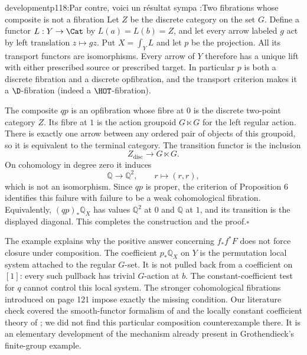 \begin{dcomment}{development}{p118:Par contre, voici un résultat sympa :}{Two fibrations whose composite is not a fibration}
Let $Z$ be the discrete category on the set $G$. Define a functor $L:Y\to\Cat$ by $L(a)=L(b)=Z$, and let every arrow labeled $g$ act by left translation $z\mapsto gz$. Put $X=\int_Y L$ and let $p$ be the projection. All its transport functors are isomorphisms. Every arrow of $Y$ therefore has a unique lift with either prescribed source or prescribed target. In particular $p$ is both a discrete fibration and a discrete opfibration, and the transport criterion makes it a $\D$-fibration (indeed a $\HOT$-fibration).

The composite $qp$ is an opfibration whose fibre at $0$ is the discrete two-point category $Z$. Its fibre at $1$ is the action groupoid $G\ltimes G$ for the left regular action. There is exactly one arrow between any ordered pair of objects of this groupoid, so it is equivalent to the terminal category. The transition functor is the inclusion
\[
 Z_{\mathrm{disc}}\longrightarrow G\ltimes G.
\]
On cohomology in degree zero it induces
\[
 \mathbb Q\longrightarrow\mathbb Q^2,
 \qquad r\longmapsto(r,r),
\]
which is not an isomorphism. Since $qp$ is proper, the criterion of Proposition 6 identifies this failure with failure to be a weak cohomological fibration. Equivalently, $(qp)_*\mathbb Q_X$ has values $\mathbb Q^2$ at $0$ and $\mathbb Q$ at $1$, and its transition is the displayed diagonal. This completes the construction and the proof.\hfill$\square$

The example explains why the positive answer concerning $f_*f^*F$ does not force closure under composition. The coefficient $p_*\mathbb Q_X$ on $Y$ is the permutation local system attached to the regular $G$-set. It is not pulled back from a coefficient on $[1]$: every such pullback has trivial $G$-action at $b$. The constant-coefficient test for $q$ cannot control this local system. The stronger cohomological fibrations introduced on page 121 impose exactly the missing condition. Our literature check covered the smooth-functor formalism of \citet{Maltsiniotis2005Asphericite} and the locally constant coefficient theory of \citet{Cisinski2009LocallyConstant}; we did not find this particular composition counterexample there. It is an elementary development of the mechanism already present in Grothendieck's finite-group example.


\end{dcomment}
